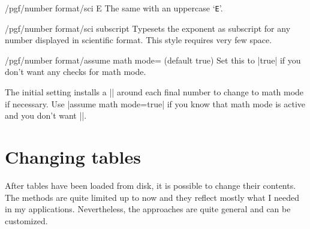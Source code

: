 \begin{key}{/pgf/number format/sci E}
The same with an uppercase `\texttt{E}'.

\begin{codeexample}[]
\end{codeexample}
\end{key}

\begin{key}{/pgf/number format/sci subscript}
Typesets the exponent as subscript for any number displayed in scientific format. This style requires very few space.

\begin{codeexample}[]
\end{codeexample}
\end{key}

\begin{key}{/pgf/number format/assume math mode= (default true)}
	Set this to |true| if you don't want any checks for math mode.
	
	The initial setting installs a |\pgfutilensuremath| around each final number to change to math mode if necessary. Use |assume math mode=true| if you know that math mode is active and you don't want |\pgfutilensuremath|.
\end{key}

\section{Changing tables}
After tables have been loaded from disk, it is possible to change their contents. The methods are quite limited up to now and they reflect mostly what I needed in my applications. Nevertheless, the approaches are quite general and can be customized.

